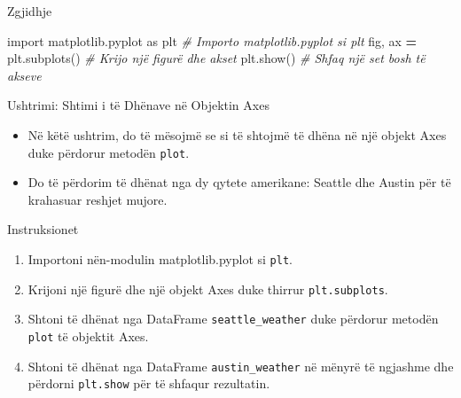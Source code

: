 \documentclass[
  ignorenonframetext,
]{beamer}
\newenvironment{Shaded}{\begin{snugshade}}{\end{snugshade}}
\newcommand{\CommentTok}[1]{\textcolor[rgb]{0.56,0.35,0.01}{\textit{#1}}}
\newcommand{\ImportTok}[1]{#1}
\newcommand{\NormalTok}[1]{#1}
\newcommand{\OperatorTok}[1]{\textcolor[rgb]{0.81,0.36,0.00}{\textbf{#1}}}
\begin{document}
\begin{frame}[fragile]{Zgjidhje}
\protect\hypertarget{zgjidhje}{}

\begin{Shaded}
\begin{Highlighting}[]
\ImportTok{import}\NormalTok{ matplotlib.pyplot }\ImportTok{as}\NormalTok{ plt  }\CommentTok{\# Importo matplotlib.pyplot si plt}
\NormalTok{fig, ax }\OperatorTok{=}\NormalTok{ plt.subplots()  }\CommentTok{\# Krijo një figurë dhe akset}
\NormalTok{plt.show()  }\CommentTok{\# Shfaq një set bosh të akseve}
\end{Highlighting}
\end{Shaded}
\end{frame}

\begin{frame}[fragile]{Ushtrimi: Shtimi i të Dhënave në Objektin Axes}
\protect\hypertarget{ushtrimi-shtimi-i-tuxeb-dhuxebnave-nuxeb-objektin-axes}{}
\begin{itemize}
\item
  Në këtë ushtrim, do të mësojmë se si të shtojmë të dhëna në një objekt
  Axes duke përdorur metodën \texttt{plot}.
\item
  Do të përdorim të dhënat nga dy qytete amerikane: Seattle dhe Austin
  për të krahasuar reshjet mujore.
\end{itemize}
\end{frame}

\begin{frame}[fragile]{Instruksionet}
\protect\hypertarget{instruksionet-1}{}
\begin{enumerate}
\item
  Importoni nën-modulin matplotlib.pyplot si \texttt{plt}.
\item
  Krijoni një figurë dhe një objekt Axes duke thirrur
  \texttt{plt.subplots}.
\item
  Shtoni të dhënat nga DataFrame \texttt{seattle\_weather} duke përdorur
  metodën \texttt{plot} të objektit Axes.
\item
  Shtoni të dhënat nga DataFrame \texttt{austin\_weather} në mënyrë të
  ngjashme dhe përdorni \texttt{plt.show} për të shfaqur rezultatin.
\end{enumerate}
\end{frame}
\end{document}
